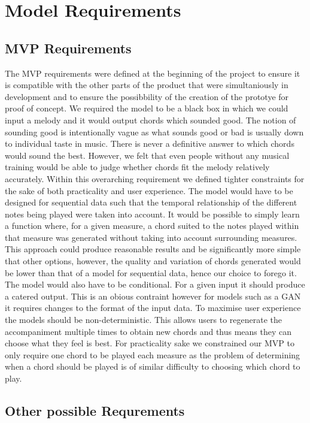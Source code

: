 \section{Model Requirements}
\label{sec:Evaluation}
\subsection{MVP Requirements}
\label{sec:MVPRequirements}
The MVP requirements were defined at the beginning of the project to ensure it is compatible with the other parts of the product that were simultaniously in development and to ensure the possibbility of the creation of the prototye for proof of concept. 
We required the model to be a black box in which we could input a melody and it would output chords which sounded good.
The notion of sounding good is intentionally vague as what sounds good or bad is usually down to individual taste in music.
There is never a definitive answer to which chords would sound the best.
However, we felt %
that even people without any musical training would be able to judge whether chords fit the melody relatively accurately.
Within this overarching requirement we defined tighter constraints for the sake of both practicality and user experience. 
The model would have to be designed for sequential data such that the temporal relationship of the different notes being played were taken into account.
It would be possible to simply learn a function where, for a given measure, a chord suited to the notes played within that measure was generated without taking into account surrounding measures.
This approach could produce reasonable results and be significantly more simple that other options, however, the quality and variation of chords generated would be lower than that of a model for sequential data, hence our choice to forego it.
The model would also have to be conditional. For a given input it should produce a catered output. This is an obious contraint however for models such as a GAN it requires changes to the format of the input data.
To maximise user experience the models should be non-deterministic. This allows users to regenerate the accompaniment multiple times to obtain new chords and thus means they can choose what they feel is best.
For practicality sake we constrained our MVP to only require one chord to be played each measure as the problem of determining when a chord should be played is of similar difficulty to choosing which chord to play.
\subsection{Other possible Requrements}

